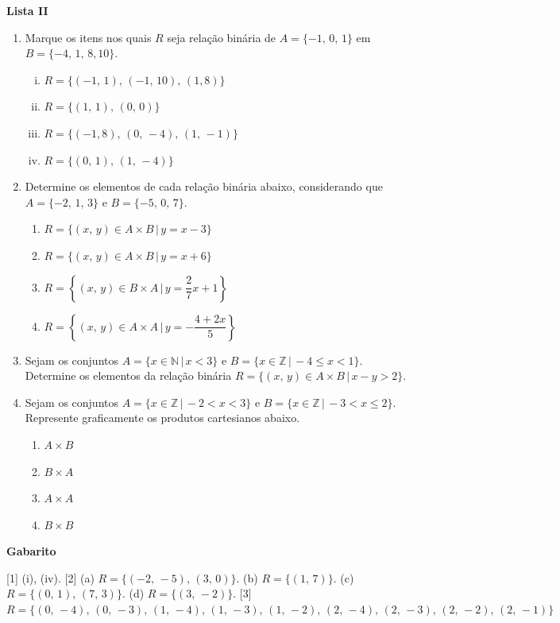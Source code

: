 \documentclass[12pt,a4paper]{article}
\begin{document}
\begin{center}
  \textbf{Lista II}
\end{center}

\begin{enumerate}
  \item Marque os itens nos quais $R$ seja relação binária de
    $A = \{-1,\,0,\,1\}$ em $B = \{-4,\,1,\,8, 10\}$.
    \begin{enumerate}[(i)]
      \item $R = \{(-1,\,1),\, (-1,\,10),\, (1, 8)\}$
      \item $R = \{(1,\,1),\, (0,\,0)\}$
      \item $R = \{(-1, 8),\, (0,\,-4),\, (1,\,-1)\}$
      \item $R = \{(0,\,1),\, (1,\,-4)\}$
    \end{enumerate}

  \item Determine os elementos de cada relação binária abaixo,
    considerando que $A = \{-2,\,1,\,3\}$ e $B = \{-5,\, 0,\, 7\}$.
    \begin{enumerate}
      \item $R = \{(x,\,y) \in A\times B \,|\, y = x - 3\}$
      \item $R = \{(x,\,y) \in A\times B \,|\, y = x + 6\}$
      \item $R = \left\{(x,\,y) \in B\times A \,|\, y = \dfrac{2}{7}x + 1\right\}$
      \item $R = \left\{(x,\,y) \in A\times A \,|\, y = -\dfrac{4 + 2x}{5}\right\}$
    \end{enumerate}
    
  \item Sejam os conjuntos $A = \{x\in\mathbb{N}\,|\, x < 3\}$ e 
    $B = \{x\in\mathbb{Z}\,|\, -4\leq x < 1\}$. Determine os elementos da relação
    binária $R = \{(x,\,y) \in A\times B \,|\, x - y > 2\}$.

  \item Sejam os conjuntos $A = \{x\in\mathbb{Z}\,|\, -2 < x < 3\}$ e 
    $B = \{x\in\mathbb{Z}\,|\, -3 < x \leq 2\}$. Represente graficamente os
    produtos cartesianos abaixo.
    \begin{enumerate}
      \item $A\times B$
      \item $B\times A$
      \item $A\times A$
      \item $B\times B$
    \end{enumerate}
    
\end{enumerate}

\begin{center}
  \textbf{Gabarito}
\end{center}

[1] (i), (iv). 
[2] (a) $R = \{(-2,\, -5),\, (3,\, 0)\}$. (b) $R = \{(1,\, 7)\}$. (c) $R = \{(0,\, 1),\, (7,\, 3)\}$. 
(d) $R = \{(3,\, -2)\}$. %
[3] $R = \{(0,\, -4),\, (0,\, -3),\, (1,\, -4),\, (1,\, -3),\, (1,\, -2),\, (2,\, -4),\, (2,\, -3),\, (2,\, -2),\, (2,\, -1)\}$ 
\end{document}
